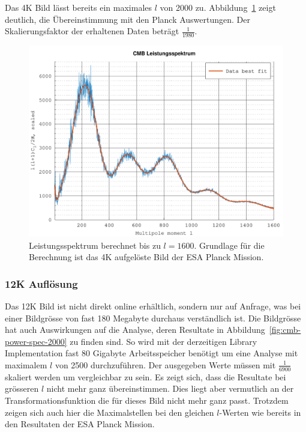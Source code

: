 Das 4K Bild lässt bereits ein maximales $l$ von 2000 zu. 
Abbildung~\ref{fig:cmb-power-spec-1600} zeigt deutlich, die Übereinstimmung mit 
den Planck Auswertungen. Der Skalierungsfaktor der erhaltenen Daten beträgt 
$\frac{1}{1980}$.

\begin{figure}
	\centering
	\includegraphics[width=\linewidth]{cmb/data/4k1800-500.pdf}
	\caption{Leistungsspektrum berechnet bis zu $l = 1600$. Grundlage für die 
		Berechnung ist das 4K aufgelöste Bild der ESA Planck Mission.}
	\label{fig:cmb-power-spec-1600}
\end{figure}

\subsubsection{12K Auflösung}

Das 12K Bild ist nicht direkt online erhältlich, sondern nur auf Anfrage, was 
bei einer Bildgrösse von fast 180 Megabyte durchaus verständlich ist. Die 
Bildgrösse hat auch Auswirkungen auf die Analyse, deren Resultate in 
Abbildung~\ref{fig:cmb-power-spec-2000} zu finden sind. So wird mit der 
derzeitigen Library Implementation fast 80 Gigabyte Arbeitsspeicher benötigt um 
eine Analyse mit maximalem $l$ von 2500 durchzuführen. Der ausgegeben Werte 
müssen mit $\frac{1}{6900}$ skaliert werden um vergleichbar zu sein. Es zeigt 
sich, dass die Resultate bei grösseren $l$ nicht mehr ganz übereinstimmen. Dies 
liegt aber vermutlich an der Transformationsfunktion die für dieses Bild nicht 
mehr ganz passt. Trotzdem zeigen sich auch hier die Maximalstellen bei den 
gleichen 
$l$-Werten wie bereits in den Resultaten der ESA Planck Mission.

